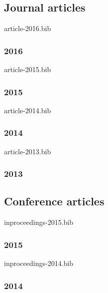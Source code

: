 \makeatletter
\let\jobname@sav=\jobname
\def\jobname{liste_publications}

\subsection*{Journal articles}
\begin{btSect}{article-2016.bib}
\subsubsection*{2016}\btPrintAll
\end{btSect}

\begin{btSect}{article-2015.bib}
\subsubsection*{2015}\btPrintAll
\end{btSect}

\begin{btSect}{article-2014.bib}
\subsubsection*{2014}\btPrintAll
\end{btSect}

\begin{btSect}{article-2013.bib}
\subsubsection*{2013}\btPrintAll
\end{btSect}

\subsection*{Conference articles}
\begin{btSect}{inproceedings-2015.bib}
\subsubsection*{2015}\btPrintAll
\end{btSect}

\begin{btSect}{inproceedings-2014.bib}
\subsubsection*{2014}\btPrintAll
\end{btSect}

